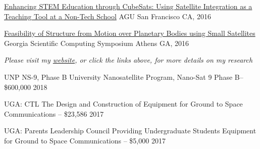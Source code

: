 \documentclass[10pt,a4paper]{article}
\begin{document}
\headedsection
  {{\color{bluegreen} \faMapO} \href{http://smallsat.uga.edu/images/documents/posters/AGU2016-SSRL-final3.pdf}{Enhancing STEM Education through CubeSats: Using Satellite Integration as a Teaching Tool at a Non-Tech School}}{%
  \headedsubsection
    {AGU}
    {San Francisco CA, 2016}
    {}
}

\headedsection
  {{\color{bluegreen} \faMapO} \href{http://smallsat.uga.edu/images/documents/posters/2017-GeorgiaScientificComputingSymposium\%20final.pdf}{Feasibility of Structure from Motion over Planetary Bodies using Small Satellites}}{%
  \headedsubsection
    {Georgia Scientific Computing Symposium}
    {Athens GA, 2016}
    {}
}

\begin{center}
  \emph{\small Please visit my \href{http://calebadams.space}{website}, or click the links above, for more details on my research}
\end{center}


\spacedhrule{0.5em}{-0.4em}

\vspace{-0.2em}

\headedsection
  {{UNP NS-9, Phase B}}
  {%
  \headedsubsection
    {University Nanosatellite Program, Nano-Sat 9 Phase B-- \$600,000}
    {2018}
    {}
}

\headedsection
  {{UGA: CTL}}
  {%
  \headedsubsection
    {The Design and Construction of Equipment for Ground to Space Communications -- \$23,586}
    {2017}
    {}
}

\headedsection
  {{UGA: Parents Leadership Council }}
  {%
  \headedsubsection
    {Providing Undergraduate Students Equipment for Ground to Space Communications  -- \$5,000}
    {2017}
    {}
}
\end{document}

